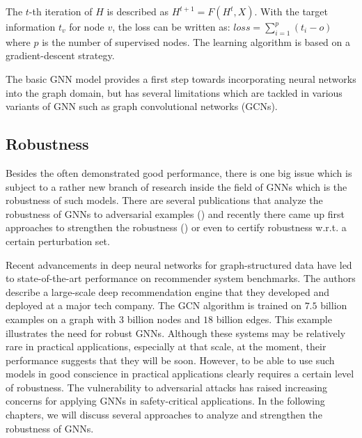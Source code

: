 \documentclass[a4paper,preprint]{sig-alternate}
\begin{document}
The $t$-th iteration of $H$ is described as $H^{t + 1} = F(H^t, X)$.
With the target information $t_v$ for node $v$, the loss can be written as:
$loss = \sum_{i=1}^p (t_i - o)$
where $p$ is the number of supervised nodes. The learning algorithm is based on a gradient-descent strategy.\newline

The basic GNN model provides a first step towards incorporating neural networks
into the graph domain, but has several limitations \cite{article} which are tackled in various variants
of GNN such as graph convolutional networks (GCNs).\newline

\subsection{Robustness}

Besides the often demonstrated good performance, there is one big issue which is subject to a rather new branch of research inside the field of GNNs 
which is the robustness of such models. There are several publications that analyze the robustness of GNNs to adversarial examples ()
and recently there came up first approaches to strengthen the robustness () or even to certify robustness w.r.t. a certain perturbation set.\newline

Recent advancements in deep neural networks for graph-structured data have led to state-of-the-art performance on recommender system benchmarks.\cite{Ying_2018}
The authors describe a large-scale deep recommendation engine that they developed and deployed at a major tech company.
The GCN algorithm is trained on $7.5$ billion examples on a graph with $3$ billion nodes and $18$ billion edges.
This example illustrates the need for robust GNNs. Although these systems may be relatively rare in practical applications, especially at
that scale, at the moment, their performance suggests that they will be soon. However, to be able to use such models in good conscience 
in practical applications clearly requires a certain level of robustness.\newline
The vulnerability to adversarial attacks has raised increasing concerns for applying GNNs in safety-critical applications. \cite{jin2020graph}\newline
In the following chapters, we will discuss several approaches to analyze and strengthen the robustness of GNNs.\newline
\end{document}
